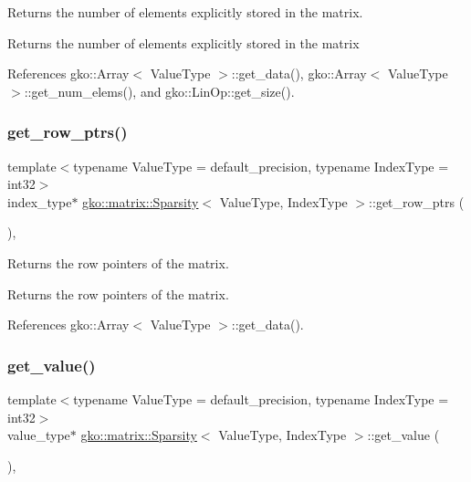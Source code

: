 Returns the number of elements explicitly stored in the matrix. 

\begin{DoxyReturn}{Returns}
the number of elements explicitly stored in the matrix 
\end{DoxyReturn}


References gko\+::\+Array$<$ Value\+Type $>$\+::get\+\_\+data(), gko\+::\+Array$<$ Value\+Type $>$\+::get\+\_\+num\+\_\+elems(), and gko\+::\+Lin\+Op\+::get\+\_\+size().

\mbox{\label{classgko_1_1matrix_1_1Sparsity_af16880db90b23fd70c14cf444a854eaf}} 
\subsubsection{\texorpdfstring{get\+\_\+row\+\_\+ptrs()}{get\_row\_ptrs()}}
{\footnotesize\ttfamily template$<$typename Value\+Type  = default\+\_\+precision, typename Index\+Type  = int32$>$ \\
index\+\_\+type$\ast$ \hyperlink{classgko_1_1matrix_1_1Sparsity}{gko\+::matrix\+::\+Sparsity}$<$ Value\+Type, Index\+Type $>$\+::get\+\_\+row\+\_\+ptrs (\begin{DoxyParamCaption}{ }\end{DoxyParamCaption})\hspace{0.3cm}{\ttfamily [inline]}, {\ttfamily [noexcept]}}



Returns the row pointers of the matrix. 

\begin{DoxyReturn}{Returns}
the row pointers of the matrix. 
\end{DoxyReturn}


References gko\+::\+Array$<$ Value\+Type $>$\+::get\+\_\+data().

\mbox{\label{classgko_1_1matrix_1_1Sparsity_a1c089c1ee66116b771e4fe8b6fdf3f3b}} 
\subsubsection{\texorpdfstring{get\+\_\+value()}{get\_value()}}
{\footnotesize\ttfamily template$<$typename Value\+Type  = default\+\_\+precision, typename Index\+Type  = int32$>$ \\
value\+\_\+type$\ast$ \hyperlink{classgko_1_1matrix_1_1Sparsity}{gko\+::matrix\+::\+Sparsity}$<$ Value\+Type, Index\+Type $>$\+::get\+\_\+value (\begin{DoxyParamCaption}{ }\end{DoxyParamCaption})\hspace{0.3cm}{\ttfamily [inline]}, {\ttfamily [noexcept]}}



